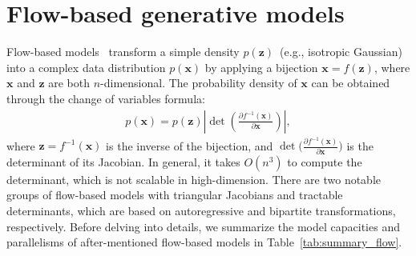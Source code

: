 \documentclass{article}
\newcommand{\vv}[1]{\boldsymbol{#1}}
\begin{document}
\vspace{-.2em}
\section{Flow-based generative models}
\label{sec:flow_based_models}
\vspace{-.1em}
Flow-based models~\citep{dinh2014nice,dinh2016density,rezende2015variational} transform a simple density $p(\vv z)$~(e.g., isotropic Gaussian) into a complex data distribution $p(\vv x)$ by applying a bijection $\vv x = f(\vv z)$, where $\vv x$ and $\vv z$ are both $n$-dimensional. 
The probability density of $\vv x$ can be obtained through the change of variables formula:
\begin{align}
\label{eq:change_of_variable}
    p(\vv x) =  p(\vv z)  
    \left| \det\left( \frac{\partial f^{-1}(\vv x) }{\partial \vv x} \right) \right| , 
\end{align}
where $\vv z = f^{-1}(\vv x)$ is the inverse of the bijection, 
and $\det \big(\frac{\partial f^{-1}(\vv x) }{\partial \vv x} \big)$ is the determinant of its Jacobian. 
In general, it takes $O(n^3)$ to compute the determinant, which is not scalable in high-dimension.
There are two notable groups of flow-based models with triangular Jacobians and tractable determinants, which are based on autoregressive and bipartite transformations, respectively.
Before delving into details, we summarize the model capacities and parallelisms of after-mentioned flow-based models in Table~\ref{tab:summary_flow}.


\vspace{-.2em}
\end{document}
